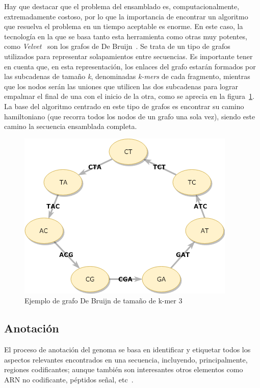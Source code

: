 Hay que destacar que el problema del ensamblado es, computacionalmente, extremadamente costoso, por lo que la importancia de encontrar un algoritmo que resuelva el problema en un tiempo aceptable es enorme. En este caso, la tecnología en la que se basa tanto esta herramienta como otras muy potentes, como \textit{Velvet}~\cite{Zerbino2008} son los grafos de De Bruijn~\cite{Compeau2011}. Se trata de un tipo de grafos utilizados para representar solapamientos entre secuencias. Es importante tener en cuenta que, en esta representación, los enlaces del grafo estarán formados por las subcadenas de tamaño \textit{k}, denominadas \textit{k-mers} de cada fragmento, mientras que los nodos serán las uniones que utilicen las dos subcadenas para lograr empalmar el final de una con el inicio de la otra, como se aprecia en la figura~\ref{fig:DeBruijn}. La base del algoritmo centrado en este tipo de grafos es encontrar su camino hamiltoniano (que recorra todos los nodos de un grafo una sola vez), siendo este camino la secuencia ensamblada completa.

\begin{figure}
    \begin{center}
      \includegraphics[scale=0.5]{images/DeBruijnGraph.png}
      \caption{Ejemplo de grafo De Bruijn de tamaño de  k-mer 3}
      \label{fig:DeBruijn}
    \end{center}
\end{figure}

\subsection{Anotación}
El proceso de anotación del genoma se basa en identificar y etiquetar todos los aspectos relevantes encontrados en una secuencia, incluyendo, principalmente, regiones codificantes; aunque también son interesantes otros elementos como ARN no codificante, péptidos señal, etc~\cite{RichardsonWatson2012}. 

